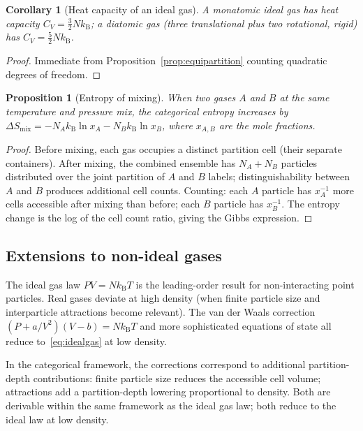 \documentclass[11pt,twocolumn,a4paper]{article}
\theoremstyle{axiomstyle}
\theoremstyle{conseqstyle}
\newtheorem{proposition}{Proposition}
\newtheorem{corollary}{Corollary}
\theoremstyle{definition}
\theoremstyle{remark}
\newcommand{\kB}{k_{\mathrm{B}}}
\begin{document}
\begin{corollary}[Heat capacity of an ideal gas]
\label{cor:heatcap}
A monatomic ideal gas has heat capacity $C_{V}=\tfrac{3}{2}N\kB$; a diatomic gas (three translational plus two rotational, rigid) has $C_{V}=\tfrac{5}{2}N\kB$.
\end{corollary}

\begin{proof}
Immediate from Proposition~\ref{prop:equipartition} counting quadratic degrees of freedom.
\end{proof}

\begin{proposition}[Entropy of mixing]
\label{prop:entmix}
When two gases $A$ and $B$ at the same temperature and pressure mix, the categorical entropy increases by $\Delta S_{\mathrm{mix}}=-N_{A}\kB\ln x_{A}-N_{B}\kB\ln x_{B}$, where $x_{A,B}$ are the mole fractions.
\end{proposition}

\begin{proof}
Before mixing, each gas occupies a distinct partition cell (their separate containers). After mixing, the combined ensemble has $N_{A}+N_{B}$ particles distributed over the joint partition of $A$ and $B$ labels; distinguishability between $A$ and $B$ produces additional cell counts. Counting: each $A$ particle has $x_{A}^{-1}$ more cells accessible after mixing than before; each $B$ particle has $x_{B}^{-1}$. The entropy change is the log of the cell count ratio, giving the Gibbs expression.
\end{proof}

\subsection{Extensions to non-ideal gases}

The ideal gas law $PV=N\kB T$ is the leading-order result for non-interacting point particles. Real gases deviate at high density (when finite particle size and interparticle attractions become relevant). The van der Waals correction $(P+a/V^{2})(V-b)=N\kB T$ and more sophisticated equations of state all reduce to~\eqref{eq:idealgas} at low density.

In the categorical framework, the corrections correspond to additional partition-depth contributions: finite particle size reduces the accessible cell volume; attractions add a partition-depth lowering proportional to density. Both are derivable within the same framework as the ideal gas law; both reduce to the ideal law at low density.
\end{document}
